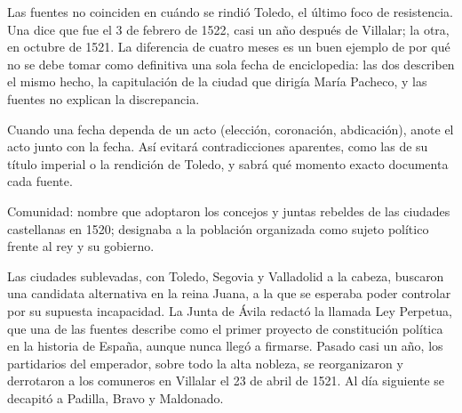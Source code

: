 \documentclass{book}
\begin{document}
\begin{tcolorbox}[title={Consejo}, studiumtip, breakable]

Las fuentes no coinciden en cuándo se rindió Toledo, el último foco de resistencia. Una dice que fue el 3 de febrero de 1522, casi un año después de Villalar; la otra, en octubre de 1521. La diferencia de cuatro meses es un buen ejemplo de por qué no se debe tomar como definitiva una sola fecha de enciclopedia: las dos describen el mismo hecho, la capitulación de la ciudad que dirigía María Pacheco, y las fuentes no explican la discrepancia.


Cuando una fecha dependa de un acto (elección, coronación, abdicación), anote el acto junto con la fecha. Así evitará contradicciones aparentes, como las de su título imperial o la rendición de Toledo, y sabrá qué momento exacto documenta cada fuente.

\end{tcolorbox}

\begin{tcolorbox}[title={Definición}, studiumdef, breakable]

Comunidad: nombre que adoptaron los concejos y juntas rebeldes de las ciudades castellanas en 1520; designaba a la población organizada como sujeto político frente al rey y su gobierno.

\end{tcolorbox}

\begin{tcolorbox}[title={Definición}, studiumdef, breakable]

Las ciudades sublevadas, con Toledo, Segovia y Valladolid a la cabeza, buscaron una candidata alternativa en la reina Juana, a la que se esperaba poder controlar por su supuesta incapacidad. La Junta de Ávila redactó la llamada Ley Perpetua, que una de las fuentes describe como el primer proyecto de constitución política en la historia de España, aunque nunca llegó a firmarse. Pasado casi un año, los partidarios del emperador, sobre todo la alta nobleza, se reorganizaron y derrotaron a los comuneros en Villalar el 23 de abril de 1521. Al día siguiente se decapitó a Padilla, Bravo y Maldonado.

\end{tcolorbox}
\end{document}
